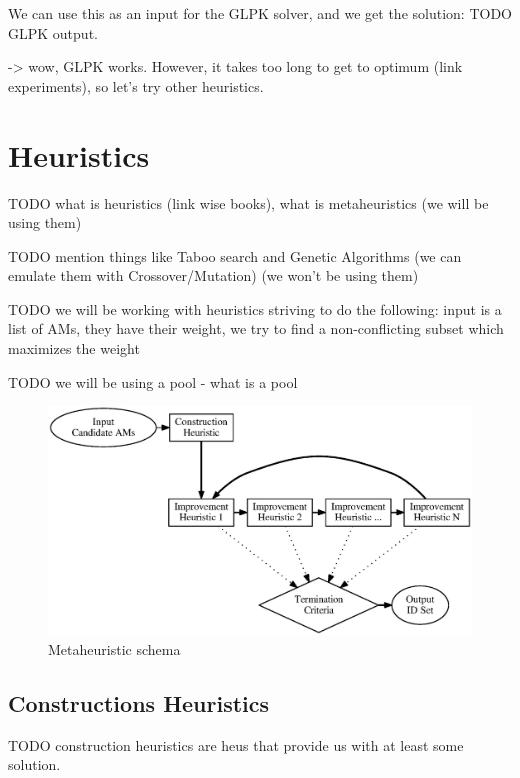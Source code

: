 We can use this as an input for the GLPK solver, and we get the solution: TODO GLPK output.

 -> wow, GLPK works. However, it takes too long to get to optimum (link experiments), so let's try other heuristics.

\section{Heuristics}

TODO what is heuristics (link wise books), what is metaheuristics (we will be using them)

TODO mention things like Taboo search and Genetic Algorithms (we can emulate them with Crossover/Mutation) (we won't be using them)

TODO we will be working with heuristics striving to do the following: input is a list of AMs, they have their weight, we try to find a non-conflicting subset which maximizes the weight

TODO we will be using a pool - what is a pool

\begin{figure}
  \caption{Metaheuristic schema}
  \label{image-metaheuristic}
  \centering
    \includegraphics[width=\textwidth]{images/metaheuristic}
\end{figure}

\subsection{Constructions Heuristics}

TODO construction heuristics are heus that provide us with at least some solution.

\subsubsection{}
\label{section-mip-fidax}

